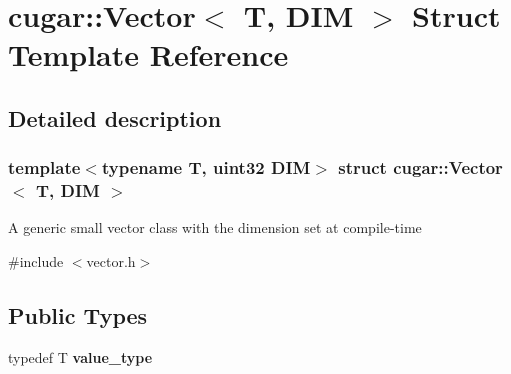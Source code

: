 \hypertarget{structcugar_1_1_vector}{}\section{cugar\+:\+:Vector$<$ T, D\+IM $>$ Struct Template Reference}
\label{structcugar_1_1_vector}


\subsection{Detailed description}
\subsubsection*{template$<$typename T, uint32 D\+IM$>$\newline
struct cugar\+::\+Vector$<$ T, D\+I\+M $>$}

A generic small vector class with the dimension set at compile-\/time 

{\ttfamily \#include $<$vector.\+h$>$}

\subsection*{Public Types}
\begin{DoxyCompactItemize}
\item 
\mbox{\label{structcugar_1_1_vector_a1f714fd0a0f7c0a996b88fd44621c624}} 
typedef T {\bfseries value\+\_\+type}
\end{DoxyCompactItemize}
